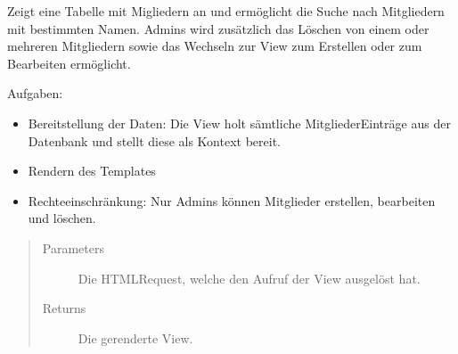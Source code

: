 \documentclass[letterpaper,10pt,english]{sphinxmanual}
\begin{document}

\begin{fulllineitems}
\label{\detokenize{masterCodeDoc:mitglieder.views.main_screen}}
Zeigt eine Tabelle mit Migliedern an und ermöglicht die Suche nach Mitgliedern mit bestimmten Namen.
Admins wird zusätzlich das Löschen von einem oder mehreren Mitgliedern sowie das Wechseln zur View zum Erstellen oder zum Bearbeiten ermöglicht.

Aufgaben:
\begin{itemize}
\item {} 
Bereitstellung der Daten: Die View holt sämtliche Mitglieder\sphinxhyphen{}Einträge aus der Datenbank und stellt diese als Kontext bereit.

\item {} 
Rendern des Templates

\item {} 
Rechteeinschränkung: Nur Admins können Mitglieder erstellen, bearbeiten und löschen.

\end{itemize}
\begin{quote}\begin{description}
\item[{Parameters}] \leavevmode
{} \textendash{} Die HTML\sphinxhyphen{}Request, welche den Aufruf der View ausgelöst hat.

\item[{Returns}] \leavevmode
Die gerenderte View.

\end{description}\end{quote}

\end{fulllineitems}

\end{document}
